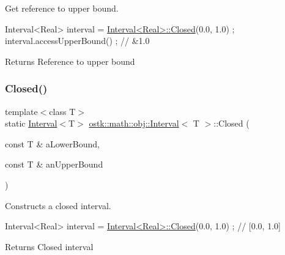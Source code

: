 Get reference to upper bound. 


\begin{DoxyCode}
Interval<Real> interval = \hyperlink{classostk_1_1math_1_1obj_1_1_interval_a48e9f436e8994c49026a1ecd503bc190}{Interval<Real>::Closed}(0.0, 1.0) ;
interval.accessUpperBound() ; \textcolor{comment}{// &1.0}
\end{DoxyCode}


\begin{DoxyReturn}{Returns}
Reference to upper bound 
\end{DoxyReturn}
\mbox{\label{classostk_1_1math_1_1obj_1_1_interval_a48e9f436e8994c49026a1ecd503bc190}} 
\subsubsection{\texorpdfstring{Closed()}{Closed()}}
{\footnotesize\ttfamily template$<$class T$>$ \\
static \hyperlink{classostk_1_1math_1_1obj_1_1_interval}{Interval}$<$T$>$ \hyperlink{classostk_1_1math_1_1obj_1_1_interval}{ostk\+::math\+::obj\+::\+Interval}$<$ T $>$\+::Closed (\begin{DoxyParamCaption}\item[{const T \&}]{a\+Lower\+Bound,  }\item[{const T \&}]{an\+Upper\+Bound }\end{DoxyParamCaption})\hspace{0.3cm}{\ttfamily [static]}}



Constructs a closed interval. 


\begin{DoxyCode}
Interval<Real> interval = \hyperlink{classostk_1_1math_1_1obj_1_1_interval_a48e9f436e8994c49026a1ecd503bc190}{Interval<Real>::Closed}(0.0, 1.0) ; \textcolor{comment}{// [0.0, 1.0]}
\end{DoxyCode}


\begin{DoxyReturn}{Returns}
Closed interval 
\end{DoxyReturn}
\mbox{\label{classostk_1_1math_1_1obj_1_1_interval_a78acbb2eb10761ffd0f0d6198391a3fa}} 
